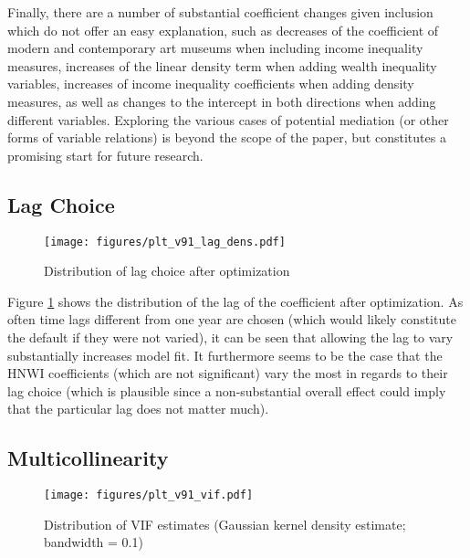 \documentclass[11pt]{article}
\begin{document}
Finally, there are a number of substantial coefficient changes given inclusion which do not offer an easy explanation, such as decreases of the coefficient of modern and contemporary art museums when including income inequality measures, increases of the linear density term when adding wealth inequality variables, increases of income inequality coefficients when adding density measures, as well as changes to the intercept in both directions when adding different variables. 
Exploring the various cases of potential mediation (or other forms of variable relations) is beyond the scope of the paper, but constitutes a promising start for future research.






\subsection{Lag Choice}

\begin{figure}[htbp]
\centering
\texttt{[image: figures/plt\_v91\_lag\_dens.pdf]}
\caption{\label{fig:lag_dens}Distribution of lag choice after optimization}
\end{figure}

Figure \ref{fig:lag_dens} shows the distribution of the lag of the coefficient after optimization.
As often time lags different from one year are chosen (which would likely constitute the default if they were not varied), it can be seen that allowing the lag to vary substantially increases model fit. 
It furthermore seems to be the case that the HNWI coefficients (which are not significant) vary the most in regards to their lag choice (which is plausible since a non-substantial overall effect could imply that the particular lag does not matter much). 




\subsection{Multicollinearity}


\begin{figure}[htbp]
\centering
\texttt{[image: figures/plt\_v91\_vif.pdf]}
\caption{\label{fig:vif}Distribution of VIF estimates (Gaussian kernel density estimate; bandwidth = 0.1)}
\end{figure}
\end{document}
